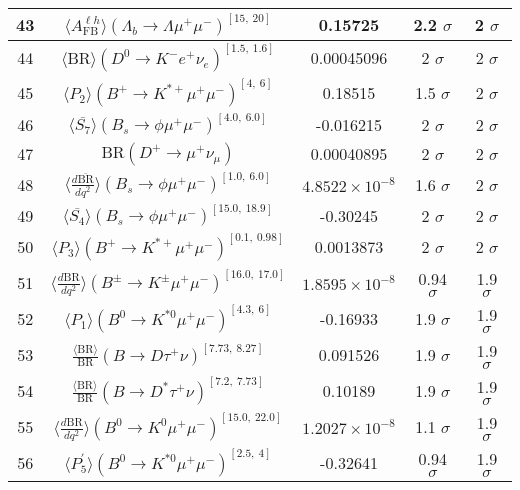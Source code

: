\begin{longtable}{|c|c|c|c|c|}
43 &	 $\langle A_\mathrm{FB}^{\ell h}\rangle(\Lambda_b\to\Lambda \mu^+\mu^-)^{[15,\  20]}$ &	 0.15725 &	 \cellcolor{red!7}2.2 $ \sigma$ &	 2 $ \sigma$ \\ \hline
44 &	 $\langle\mathrm{BR}\rangle(D^0\to K^- e^+\nu_e)^{[1.5,\  1.6]}$ &	 0.00045096 &	 \cellcolor{green!0}2 $ \sigma$ &	 2 $ \sigma$ \\ \hline
45 &	 $\langle P_2\rangle(B^+\to K^{\ast +}\mu^+\mu^-)^{[4,\  6]}$ &	 0.18515 &	 \cellcolor{green!24}1.5 $ \sigma$ &	 2 $ \sigma$ \\ \hline
46 &	 $\langle \overline{S_7}\rangle(B_s\to \phi \mu^+\mu^-)^{[4.0,\  6.0]}$ &	 -0.016215 &	 \cellcolor{red!0}2 $ \sigma$ &	 2 $ \sigma$ \\ \hline
47 &	 $\mathrm{BR}(D^+\to \mu^+\nu_\mu)$ &	 0.00040895 &	 \cellcolor{green!0}2 $ \sigma$ &	 2 $ \sigma$ \\ \hline
48 &	 $\langle \frac{d\overline{\mathrm{BR}}}{dq^2} \rangle(B_s\to \phi \mu^+\mu^-)^{[1.0,\  6.0]}$ &	 $4.8522\times 10^{-8}$ &	 \cellcolor{green!16}1.6 $ \sigma$ &	 2 $ \sigma$ \\ \hline
49 &	 $\langle \overline{S_4}\rangle(B_s\to \phi \mu^+\mu^-)^{[15.0,\  18.9]}$ &	 -0.30245 &	 \cellcolor{green!0}2 $ \sigma$ &	 2 $ \sigma$ \\ \hline
50 &	 $\langle P_3\rangle(B^+\to K^{\ast +}\mu^+\mu^-)^{[0.1,\  0.98]}$ &	 0.0013873 &	 \cellcolor{green!0}2 $ \sigma$ &	 2 $ \sigma$ \\ \hline
51 &	 $\langle \frac{d\mathrm{BR}}{dq^2} \rangle(B^\pm\to K^\pm \mu^+\mu^-)^{[16.0,\  17.0]}$ &	 $1.8595\times 10^{-8}$ &	 \cellcolor{green!50}0.94 $ \sigma$ &	 1.9 $ \sigma$ \\ \hline
52 &	 $\langle P_1\rangle(B^0\to K^{\ast 0}\mu^+\mu^-)^{[4.3,\  6]}$ &	 -0.16933 &	 \cellcolor{green!1}1.9 $ \sigma$ &	 1.9 $ \sigma$ \\ \hline
53 &	 $\frac{\langle \mathrm{BR} \rangle}{\mathrm{BR}}(B\to D\tau^+\nu)^{[7.73,\  8.27]}$ &	 0.091526 &	 \cellcolor{green!0}1.9 $ \sigma$ &	 1.9 $ \sigma$ \\ \hline
54 &	 $\frac{\langle \mathrm{BR} \rangle}{\mathrm{BR}}(B\to D^\ast\tau^+\nu)^{[7.2,\  7.73]}$ &	 0.10189 &	 \cellcolor{green!0}1.9 $ \sigma$ &	 1.9 $ \sigma$ \\ \hline
55 &	 $\langle \frac{d\mathrm{BR}}{dq^2} \rangle(B^0\to K^0\mu^+\mu^-)^{[15.0,\  22.0]}$ &	 $1.2027\times 10^{-8}$ &	 \cellcolor{green!39}1.1 $ \sigma$ &	 1.9 $ \sigma$ \\ \hline
56 &	 $\langle P_5^\prime\rangle(B^0\to K^{\ast 0}\mu^+\mu^-)^{[2.5,\  4]}$ &	 -0.32641 &	 \cellcolor{green!45}0.94 $ \sigma$ &	 1.9 $ \sigma$ \\ \hline

\end{longtable}
